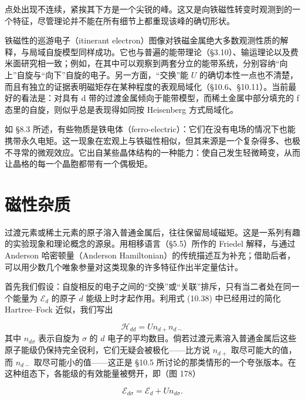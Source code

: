 点处出现不连续，紧挨其下方是一个尖锐的峰。这又是向铁磁性转变时观测到的一个特征，尽管理论并不能在所有细节上都重现该峰的确切形状。

铁磁性的巡游电子（itinerant electron）图像对铁磁金属绝大多数观测性质的解释，与局域自旋模型同样成功。它也与普遍的能带理论（§3.10）、输运理论以及费米面研究相一致；例如，在其中可以观察到两套分立的能带系统，分别容纳“向上”自旋与“向下”自旋的电子。另一方面，“交换”能 $U$ 的确切本性一点也不清楚，而且有独立的证据表明磁矩存在某种程度的表观局域化（§10.6、§10.11）。当前最好的看法是：对具有 d 带的过渡金属倾向于能带模型，而稀土金属中部分填充的 f 态里的自旋，则似乎总是表现得如同按 Heisenberg 方式局域化。

如 §8.3 所述，有些物质是铁电体（ferro-electric）：它们在没有电场的情况下也能携带永久电矩。这一现象在宏观上与铁磁性相似，但其来源是一个复杂得多、也极不寻常的微观效应。它出自某些晶体结构的一种能力：使自己发生轻微畸变，从而让晶格的每一个晶胞都带有一个偶极矩。

\section{磁性杂质}

过渡元素或稀土元素的原子溶入普通金属后，往往保留局域磁矩。这是一系列有趣的实验现象和理论概念的源泉。用相移语言（§5.5）所作的 Friedel 解释，与通过 Anderson 哈密顿量（Anderson Hamiltonian）的传统描述互为补充；借助后者，可以用少数几个唯象参量对这类现象的许多特征作出半定量估计。

首先我们假设：自旋相反的电子之间的“交换”或“关联”排斥，只有当二者处在同一个能量为 $\mathcal{E}_d$ 的原子 $d$ 能级上时才起作用。利用式 (10.38) 中已经用过的简化 Hartree--Fock 近似，我们写出

\begin{equation*}
\mathcal{H}_{dd} = U n_{d+} n_{d-} \tag{10.44}
\end{equation*}
其中 $n_{d\sigma}$ 表示自旋为 $\sigma$ 的 $d$ 电子的平均数目。倘若过渡元素溶入普通金属后这些原子能级仍保持完全锐利，它们无疑会被极化——比方说 $n_{d+}$ 取尽可能大的值，而 $n_{d-}$ 取尽可能小的值——这正是 §10.5 所讨论的那类情形的一个夸张版本。在这种组态下，各能级的有效能量被劈开，即（图 178）

\begin{equation*}
\mathcal{E}_{d\sigma} = \mathcal{E}_d + U n_{d\sigma}. \tag{10.45}
\end{equation*}

